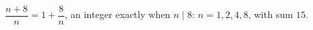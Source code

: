 $\dfrac{n+8}{n}=1+\dfrac{8}{n}$, an integer exactly when $n\mid8$: $n=1,2,4,8$, with sum $\boxed{15}$.
